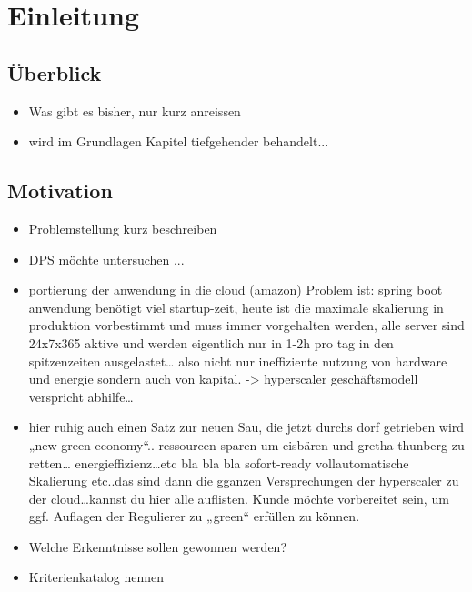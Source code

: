\chapter{Einleitung}

\section{\"Uberblick}
\begin{itemize}
  \item Was gibt es bisher, nur kurz anreissen
  \item wird im Grundlagen Kapitel tiefgehender behandelt...
\end{itemize}

\section{Motivation}
\begin{itemize}
  \item Problemstellung kurz beschreiben
  \item DPS m\"ochte untersuchen ...
  \item portierung der anwendung in die cloud (amazon)  Problem ist: spring boot anwendung benötigt viel startup-zeit, heute ist die maximale skalierung in produktion vorbestimmt und muss immer vorgehalten werden, alle server sind 24x7x365 aktive und werden eigentlich nur in 1-2h pro tag in den spitzenzeiten ausgelastet… also nicht nur ineffiziente nutzung von hardware und energie sondern auch von kapital. -> hyperscaler geschäftsmodell verspricht abhilfe…
  \item hier ruhig auch einen Satz zur neuen Sau, die jetzt durchs dorf getrieben wird „new green economy“.. ressourcen sparen um eisbären und gretha thunberg zu retten… energieffizienz…etc bla bla bla sofort-ready vollautomatische Skalierung etc..das sind dann die gganzen Versprechungen der hyperscaler zu der cloud…kannst du hier alle auflisten.  Kunde möchte vorbereitet sein, um ggf. Auflagen der Regulierer zu „green“ erfüllen zu können.
  \item Welche Erkenntnisse sollen gewonnen werden?
  \item Kriterienkatalog nennen
\end{itemize}
